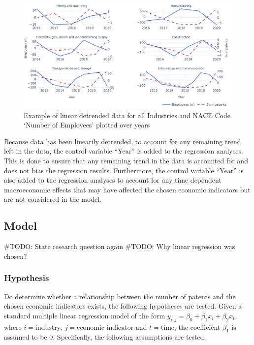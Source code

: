 \documentclass[
  11,
  a4paperpaper,
]{article}
\begin{document}
\begin{figure}[H]

{\centering \includegraphics{rieg2023_files/figure-pdf/fig-transformed-data-example-output-1.jpeg}

}

\caption{\label{fig-transformed-data-example}Example of linear detrended
data for all Industries and NACE Code `Number of Employees' plotted over
years}

\end{figure}

Because data has been linearily detrended, to account for any remaining
trend left in the data, the control variable ``Year'' is added to the
regression analyses. This is done to ensure that any remaining trend in
the data is accounted for and does not bias the regression results.
Furthermore, the control variable ``Year'' is also added to the
regression analyses to account for any time dependent macroeconomic
effects that may have affected the chosen economic indicators but are
not considered in the model.

\subsection{Model}\label{sec-model}

\#TODO: State research question again \#TODO: Why linear regression was
chosen?

\subsubsection{Hypothesis}\label{sec-hypothesis}

Do determine whether a relationship between the number of patents and
the chosen economic indicators exists, the following hypotheses are
tested. Given a standard multiple linear regression model of the form
\(y_{i,j} = \beta_0 + \beta_1x_i + \beta_2x_t\), where
\(i=\text{industry, }j=\text{economic indicator }\text{and }t=\text{time}\),
the coefficient \(\beta_1\) is assumed to be \(0\). Specifically, the
following assumptions are tested.
\end{document}
